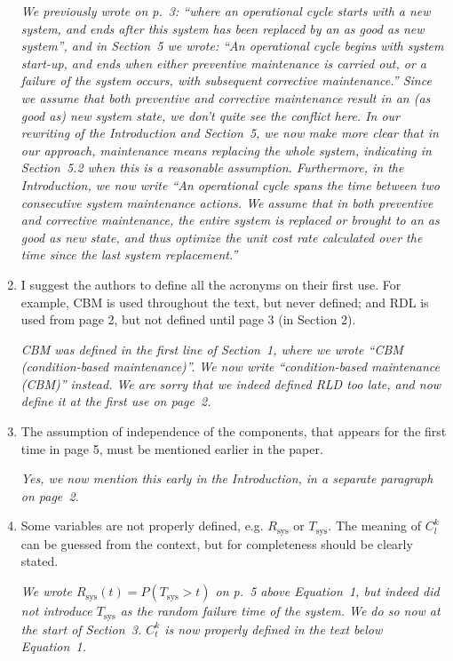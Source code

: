 \documentclass[authoryear]{elsarticle}
\newcommand{\Tsys}{T_\text{sys}}
\newcommand{\Rsys}{R_\text{sys}}
\begin{document}
\begin{enumerate}
\smallskip

\emph{We previously wrote on p.~3: ``where an operational cycle starts with a new system,
and ends after this system has been replaced by an as good as new system'',
and in Section~5 we wrote: ``An operational cycle begins with system start-up,
and ends when either preventive maintenance is carried out, or a failure of the system occurs,
with subsequent corrective maintenance.''
Since we assume that both preventive and corrective maintenance result in an (as good as) new system state,
we don't quite see the conflict here.
In our rewriting of the Introduction and Section~5,
we now make more clear that in our approach, maintenance means replacing the whole system,
indicating in Section~5.2 when this is a reasonable assumption.
Furthermore, in the Introduction, we now write
``An operational cycle spans the time between two consecutive system maintenance actions.
We assume that in both preventive and corrective maintenance, the entire system is replaced or brought to an as good as new state,
and thus optimize the unit cost rate calculated over the time since the last system replacement.''}

\item I suggest the authors to define all the acronyms on their first use. For example, CBM is used throughout the text, but never defined; and RDL is used from page 2, but not defined until page 3 (in Section 2).

\smallskip

\emph{CBM was defined in the first line of Section~1, where we wrote ``CBM (condition-based maintenance)''.
We now write ``condition-based maintenance (CBM)'' instead.
We are sorry that we indeed defined RLD too late, and now define it at the first use on page~2.}

\item The assumption of independence of the components, that appears for the first time in page 5, must be mentioned earlier in the paper.

\smallskip

\emph{Yes, we now mention this early in the Introduction, in a separate paragraph on page~2.}

\item Some variables are not properly defined, e.g. $\Rsys$ or $\Tsys$. The meaning of $C^k_l$ can be guessed from the context, but for completeness should be clearly stated.

\smallskip

\emph{We wrote $\Rsys(t) = P(\Tsys > t)$ on p.~5 above Equation~1,
but indeed did not introduce $\Tsys$ as the random failure time of the system.
We do so now at the start of Section~3.
$C^k_t$ is now properly defined in the text below Equation~1.}


\end{enumerate}
\end{document}
